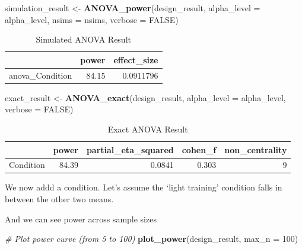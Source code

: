 \documentclass[]{book}
\newenvironment{Shaded}{\begin{snugshade}}{\end{snugshade}}
\newcommand{\CommentTok}[1]{\textcolor[rgb]{0.56,0.35,0.01}{\textit{#1}}}
\newcommand{\DataTypeTok}[1]{\textcolor[rgb]{0.13,0.29,0.53}{#1}}
\newcommand{\DecValTok}[1]{\textcolor[rgb]{0.00,0.00,0.81}{#1}}
\newcommand{\KeywordTok}[1]{\textcolor[rgb]{0.13,0.29,0.53}{\textbf{#1}}}
\newcommand{\NormalTok}[1]{#1}
\newcommand{\OtherTok}[1]{\textcolor[rgb]{0.56,0.35,0.01}{#1}}
\newcommand{\StringTok}[1]{\textcolor[rgb]{0.31,0.60,0.02}{#1}}
\begin{document}
\begin{Shaded}
\begin{Highlighting}[]
\NormalTok{simulation_result <-}\StringTok{ }\KeywordTok{ANOVA_power}\NormalTok{(design_result, }
                                 \DataTypeTok{alpha_level =}\NormalTok{ alpha_level, }
                                 \DataTypeTok{nsims =}\NormalTok{ nsims,}
                                 \DataTypeTok{verbose =} \OtherTok{FALSE}\NormalTok{)}
\end{Highlighting}
\end{Shaded}

\begin{table}[!h]

\caption{\label{tab:unnamed-chunk-249}Simulated ANOVA Result}
\centering
\begin{tabular}{l|r|r}
\hline
  & power & effect\_size\\
\hline
anova\_Condition & 84.15 & 0.0911796\\
\hline
\end{tabular}
\end{table}

\begin{Shaded}
\begin{Highlighting}[]
\NormalTok{exact_result <-}\StringTok{ }\KeywordTok{ANOVA_exact}\NormalTok{(design_result,}
                            \DataTypeTok{alpha_level =}\NormalTok{ alpha_level,}
                            \DataTypeTok{verbose =} \OtherTok{FALSE}\NormalTok{)}
\end{Highlighting}
\end{Shaded}

\begin{table}[!h]

\caption{\label{tab:unnamed-chunk-251}Exact ANOVA Result}
\centering
\begin{tabular}{l|r|r|r|r}
\hline
  & power & partial\_eta\_squared & cohen\_f & non\_centrality\\
\hline
Condition & 84.39 & 0.0841 & 0.303 & 9\\
\hline
\end{tabular}
\end{table}

We now addd a condition. Let's assume the `light training' condition falls in between the other two means.

And we can see power across sample sizes

\begin{Shaded}
\begin{Highlighting}[]
\CommentTok{# Plot power curve (from 5 to 100)}
\KeywordTok{plot_power}\NormalTok{(design_result, }\DataTypeTok{max_n =} \DecValTok{100}\NormalTok{)}
\end{Highlighting}
\end{Shaded}
\end{document}
